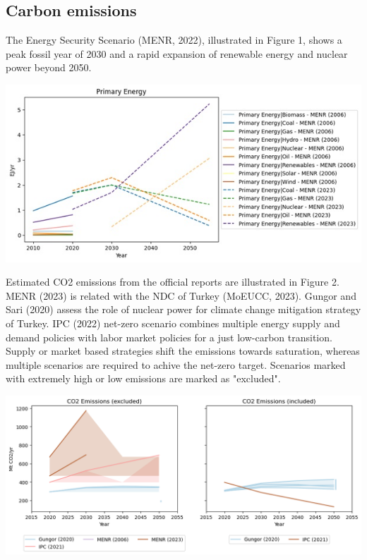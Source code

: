 \documentclass[a0,portrait]{a0poster}
\begin{document}
\begin{multicols}{3}

\section{Carbon emissions}

The Energy Security Scenario (MENR, 2022), illustrated in Figure 1, shows a peak fossil year of 2030 and a rapid expansion of renewable energy and nuclear power beyond 2050. 

\begin{center}\vspace{1cm}
    \includegraphics[width=1.0\linewidth]{Figure_1}
\end{center}\vspace{1cm}

Estimated CO2 emissions from the official reports are illustrated in Figure 2. MENR (2023) is related with the NDC of Turkey (MoEUCC, 2023). Gungor and Sari (2020) assess the role of nuclear power for climate change mitigation strategy of Turkey. IPC (2022) net-zero scenario combines multiple energy supply and demand policies with labor market policies for a just low-carbon transition. Supply or market based strategies shift the emissions towards saturation, whereas multiple scenarios are required to achive the net-zero target. Scenarios marked with extremely high or low emissions are marked as "excluded".

\begin{center}\vspace{1cm}
    \includegraphics[width=1.0\linewidth]{Figure_2}
\end{center}\vspace{1cm}


\end{multicols}
\end{document}
